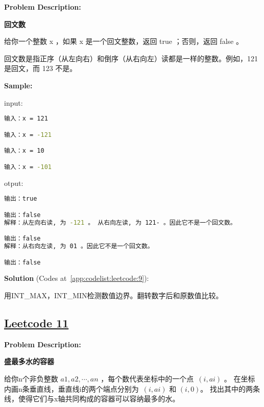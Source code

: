 \textbf{Problem Description:}\par

\textbf{回文数}\par

给你一个整数 x ，如果 x 是一个回文整数，返回 true ；否则，返回 false 。\par

回文数是指正序（从左向右）和倒序（从右向左）读都是一样的整数。例如，121 是回文，而 123 不是。\par


\textbf{Sample:}\par

input:\par

\begin{lstlisting}[language=bash]
输入：x = 121

输入：x = -121

输入：x = 10

输入：x = -101
\end{lstlisting}

otput:\par

\begin{lstlisting}[language=bash]
输出：true

输出：false
解释：从左向右读, 为 -121 。 从右向左读, 为 121- 。因此它不是一个回文数。

输出：false
解释：从右向左读, 为 01 。因此它不是一个回文数。

输出：false
\end{lstlisting}

\textbf{Solution }(Codes at~\ref{app:codelist:leetcode:9}):\par

用INT\_MAX，INT\_MIN检测数值边界。翻转数字后和原数值比较。\par



\subsection{\href{https://leetcode-cn.com/}{Leetcode 11}}\label{app:problemlist:leetcode:11}

\textbf{Problem Description:}\par

\textbf{盛最多水的容器}\par

给你n个非负整数 $ a1, a2, \cdots, an $ ，每个数代表坐标中的一个点 $ (i, ai) $ 。
在坐标内画n条垂直线，垂直线i的两个端点分别为 $ (i, ai) $ 和 $ (i, 0) $。
找出其中的两条线，使得它们与x轴共同构成的容器可以容纳最多的水。\par

